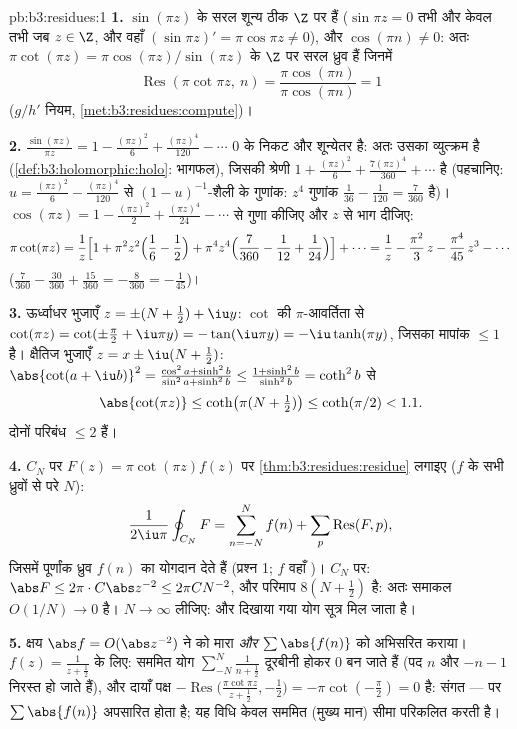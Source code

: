 \begin{solution}{pb:b3:residues:1}
\textbf{1.} $\sin(\pi z)$ के सरल शून्य ठीक $\Z$ पर हैं ($\sin\pi z = 0$ तभी और केवल
तभी जब $z \in \Z$, और वहाँ $(\sin\pi z)' = \pi\cos\pi
z \neq 0$), और $\cos(\pi n) \neq 0$: अतः $\pi\cot(\pi z) =
\pi\cos(\pi z)/\sin(\pi z)$ के $\Z$ पर सरल
ध्रुव हैं जिनमें
\[
\operatorname{Res}(\pi\cot\pi z,\ n)
= \frac{\pi\cos(\pi n)}{\pi\cos(\pi n)} = 1
\]
($g/h'$ नियम, \cref{met:b3:residues:compute})।

\textbf{2.} $\frac{\sin(\pi z)}{\pi z} = 1 - \frac{(\pi z)^2}6
+ \frac{(\pi z)^4}{120} - \cdots$ $0$ के निकट  और शून्येतर है: अतः उसका
व्युत्क्रम  है (\cref{def:b3:holomorphic:holo}: भागफल), जिसकी श्रेणी $1 +
\frac{(\pi z)^2}{6} + \frac{7(\pi z)^4}{360} + \cdots$ है
(पहचानिए: $u =
\frac{(\pi z)^2}6 - \frac{(\pi z)^4}{120}$ से $(1 - u)^{-1}$-शैली के गुणांक: $z^4$ गुणांक $\frac1{36} - \frac1{120} = \frac{7}{360}$ है)।
$\cos(\pi z) = 1 - \frac{(\pi z)^2}2 + \frac{(\pi
z)^4}{24} - \cdots$ से गुणा कीजिए और $z$ से भाग दीजिए:
\[
\pi\cot(\pi z) = \frac1z\Bigl[1 + \pi^2z^2\Bigl(\frac16 -
\frac12\Bigr) + \pi^4z^4\Bigl(\frac7{360} - \frac1{12} +
\frac1{24}\Bigr)\Bigr] + \cdots
= \frac1z - \frac{\pi^2}3\,z - \frac{\pi^4}{45}\,z^3 -
\cdots
\]
($\frac7{360} - \frac{30}{360} + \frac{15}{360} =
-\frac8{360} = -\frac1{45}$)।

\textbf{3.} ऊर्ध्वाधर भुजाएँ $z = \pm(N + \frac12) + \iu y$: $\cot$ की $\pi$-आवर्तिता से $\cot(\pi z) = \cot(\pm\frac\pi2
+ \iu\pi y) = -\tan(\iu\pi y) = -\iu\tanh(\pi y)$,
जिसका मापांक $\leq 1$ है। क्षैतिज भुजाएँ $z = x \pm \iu(N + \frac12)$: $\abs{\cot(a + \iu b)}^2 = \frac{\cos^2a +
\sinh^2b}{\sin^2a + \sinh^2b} \leq \frac{1 +
\sinh^2b}{\sinh^2b} = \coth^2 b$ से
\[
\abs{\cot(\pi z)} \leq \coth\bigl(\pi(N + \tfrac12)\bigr)
\leq \coth(\pi/2) < 1.1 .
\]
दोनों परिबंध $\leq 2$ हैं।

\textbf{4.} $C_N$ पर $F(z) =
\pi\cot(\pi z)f(z)$ पर \cref{thm:b3:residues:residue} लगाइए ($f$ के सभी ध्रुवों से
परे $N$):
\[
\frac1{2\iu\pi}\oint_{C_N}F = \sum_{n=-N}^{N}f(n) +
\sum_p\operatorname{Res}(F, p),
\]
जिसमें पूर्णांक ध्रुव $f(n)$ का योगदान देते हैं (प्रश्न 1; $f$ वहाँ
)। $C_N$ पर: $\abs F \leq 2\pi\cdot
C\abs z^{-2} \leq 2\pi C N^{-2}$, और परिमाप $8(N +
\frac12)$ है: अतः समाकल $O(1/N) \to 0$
है। $N \to
\infty$ लीजिए: और दिखाया गया योग सूत्र मिल जाता है।

\textbf{5.} क्षय $\abs f = O(\abs z^{-2})$ ने  को मारा \emph{और} $\sum\abs{f(n)}$ को
अभिसरित कराया। $f(z) = \frac1{z + \frac12}$ के लिए: सममित योग $\sum_{-N}^N\frac1{n + \frac12}$ दूरबीनी होकर $0$ बन
जाते हैं (पद $n$ और $-n - 1$ निरस्त हो जाते हैं), और दायाँ पक्ष $-\operatorname{Res}\bigl(\frac{\pi\cot\pi z}{z + \frac12},
-\frac12\bigr) = -\pi\cot(-\frac\pi2) = 0$
है: संगत --- पर $\sum\abs{f(n)}$ अपसारित होता है; यह विधि केवल सममित (मुख्य
मान) सीमा परिकलित करती है।


\end{solution}
